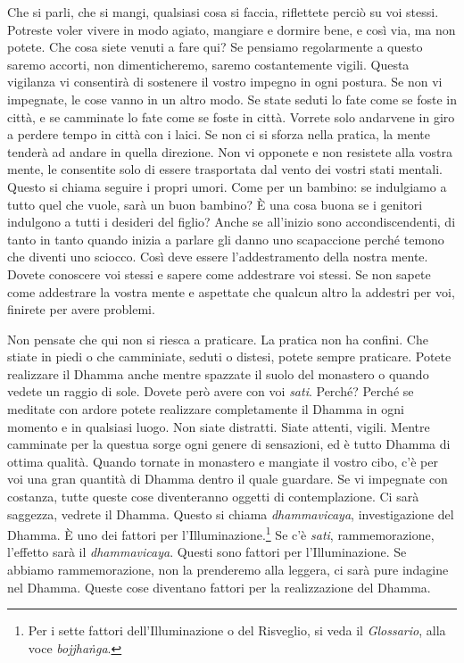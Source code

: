 Che si parli, che si mangi, qualsiasi cosa si faccia, riflettete perciò
su voi stessi. Potreste voler vivere in modo agiato, mangiare e dormire
bene, e così via, ma non potete. Che cosa siete venuti a fare qui? Se
pensiamo regolarmente a questo saremo accorti, non dimenticheremo,
saremo costantemente vigili. Questa vigilanza vi consentirà di sostenere
il vostro impegno in ogni postura. Se non vi impegnate, le cose vanno
in un altro modo. Se state seduti lo fate come se foste in città, e se
camminate lo fate come se foste in città. Vorrete solo andarvene in giro
a perdere tempo in città con i laici. Se non ci si sforza nella pratica,
la mente tenderà ad andare in quella direzione. Non vi opponete e non
resistete alla vostra mente, le consentite solo di essere trasportata
dal vento dei vostri stati mentali. Questo si chiama seguire i propri
umori. Come per un bambino: se indulgiamo a tutto quel che vuole, sarà
un buon bambino? È una cosa buona se i genitori indulgono a tutti i
desideri del figlio? Anche se all'inizio sono accondiscendenti, di tanto
in tanto quando inizia a parlare gli danno uno scapaccione perché temono
che diventi uno sciocco. Così deve essere l'addestramento della nostra
mente. Dovete conoscere voi stessi e sapere come addestrare voi stessi.
Se non sapete come addestrare la vostra mente e aspettate che qualcun
altro la addestri per voi, finirete per avere problemi.

Non pensate che qui non si riesca a praticare. La pratica non ha
confini. Che stiate in piedi o che camminiate, seduti o distesi, potete
sempre praticare. Potete realizzare il Dhamma anche mentre spazzate il
suolo del monastero o quando vedete un raggio di sole. Dovete però avere
con voi \emph{sati}. Perché? Perché se meditate con ardore potete
realizzare completamente il Dhamma in ogni momento e in qualsiasi luogo.
Non siate distratti. Siate attenti, vigili. Mentre camminate per la
questua sorge ogni genere di sensazioni, ed è tutto Dhamma di ottima
qualità. Quando tornate in monastero e mangiate il vostro cibo, c'è per
voi una gran quantità di Dhamma dentro il quale guardare. Se vi
impegnate con costanza, tutte queste cose diventeranno oggetti di
contemplazione. Ci sarà saggezza, vedrete il Dhamma. Questo si chiama
\emph{dhammavicaya}, investigazione del Dhamma. È uno dei fattori per
l'Illuminazione.\footnote{Per i sette fattori dell'Illuminazione o del
  Risveglio, si veda il \emph{Glossario}, alla voce \emph{bojjhaṅga}.}
Se c'è \emph{sati}, rammemorazione, l'effetto sarà il
\emph{dhammavicaya}. Questi sono fattori per l'Illuminazione. Se abbiamo
rammemorazione, non la prenderemo alla leggera, ci sarà pure indagine
nel Dhamma. Queste cose diventano fattori per la realizzazione del
Dhamma.

